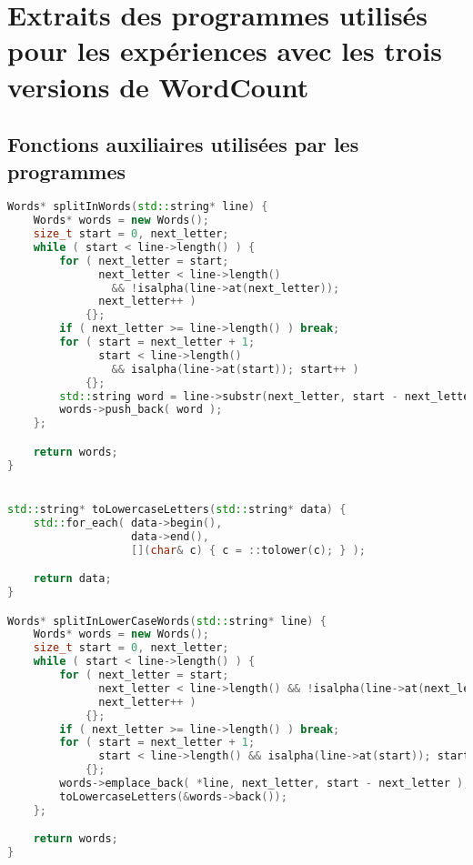 \chapter{Extraits des programmes utilisés pour les expériences avec les trois versions de {WordCount}}
\label{appendice-code-wordcount-sf.ann}

\section{Fonctions auxiliaires utilisées par les programmes}

\begin{lstlisting}[basicstyle=\ttfamily\footnotesize,language=c++]
Words* splitInWords(std::string* line) {
    Words* words = new Words();
    size_t start = 0, next_letter;
    while ( start < line->length() ) {
        for ( next_letter = start;
              next_letter < line->length()
                && !isalpha(line->at(next_letter));
              next_letter++ )
            {};
        if ( next_letter >= line->length() ) break;
        for ( start = next_letter + 1;
              start < line->length()
                && isalpha(line->at(start)); start++ )
            {};
        std::string word = line->substr(next_letter, start - next_letter); 
        words->push_back( word );
    };

    return words;
}


std::string* toLowercaseLetters(std::string* data) {
    std::for_each( data->begin(),
                   data->end(),
                   [](char& c) { c = ::tolower(c); } );

    return data;
}

Words* splitInLowerCaseWords(std::string* line) {
    Words* words = new Words();
    size_t start = 0, next_letter;
    while ( start < line->length() ) {
        for ( next_letter = start;
              next_letter < line->length() && !isalpha(line->at(next_letter));
              next_letter++ )
            {};
        if ( next_letter >= line->length() ) break;
        for ( start = next_letter + 1;
              start < line->length() && isalpha(line->at(start)); start++ )
            {};
        words->emplace_back( *line, next_letter, start - next_letter );
        toLowercaseLetters(&words->back());
    };

    return words;
}
\end{lstlisting}


